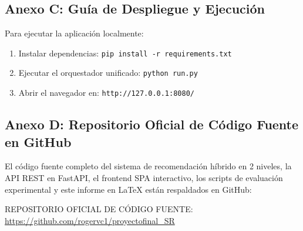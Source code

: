 \documentclass[12pt,a4paper]{article}
\begin{document}
\subsection{Anexo C: Guía de Despliegue y Ejecución}
Para ejecutar la aplicación localmente:
\begin{enumerate}
    \item Instalar dependencias: \texttt{pip install -r requirements.txt}
    \item Ejecutar el orquestador unificado: \texttt{python run.py}
    \item Abrir el navegador en: \texttt{http://127.0.0.1:8080/}
\end{enumerate}

\subsection{Anexo D: Repositorio Oficial de Código Fuente en GitHub}
El código fuente completo del sistema de recomendación híbrido en 2 niveles, la API REST en FastAPI, el frontend SPA interactivo, los scripts de evaluación experimental y este informe en LaTeX están respaldados en GitHub:

\begin{center}
    \vspace{0.2cm}
    \small REPOSITORIO OFICIAL DE CÓDIGO FUENTE: \\[0.1cm]
    \large\url{https://github.com/rogervc1/proyectofinal_SR}
    \vspace{0.2cm}
\end{center}
\end{document}
